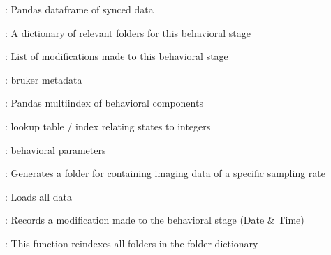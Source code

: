 \documentclass[letterpaper,10pt,english]{sphinxmanual}
\begin{document}
\begin{fulllineitems}
\begin{description}
\begin{DUlineblock}{0em}
\item[]  : Pandas dataframe of synced data
\item[]  : A dictionary of relevant folders for this behavioral stage
\item[]  : List of modifications made to this behavioral stage
\item[]  : bruker metadata
\item[] : Pandas multi\sphinxhyphen{}index of behavioral components
\item[]  : look\sphinxhyphen{}up table / index relating states to integers
\item[]  : behavioral parameters
\end{DUlineblock}

\begin{DUlineblock}{0em}
\item[]  : Generates a folder for containing imaging data of a specific sampling rate
\item[]  : Loads all data
\item[]  :  Records a modification made to the behavioral stage (Date \& Time)
\item[]  : This function reindexes all folders in the folder dictionary
\end{DUlineblock}

\end{description}

\begin{fulllineitems}
\label{\detokenize{ExperimentHierarchy:ExperimentHierarchy.BehavioralStage.load_data}}
\pysigstartsignatures
{}
\pysigstopsignatures\begin{quote}


\end{quote}
\end{fulllineitems}
\end{fulllineitems}
\end{document}
